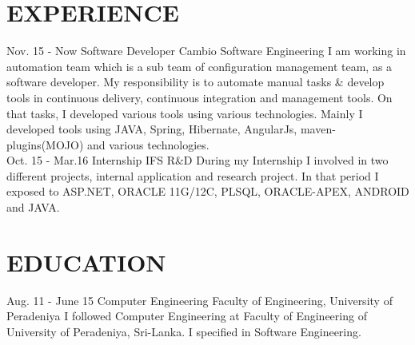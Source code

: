 \documentclass[]{cv-class}
\begin{document}
\section{EXPERIENCE}
\begin{entrylist}
  \entry
    {Nov. 15 - Now}
    {Software Developer}
    {Cambio Software Engineering}
    {I am working in automation team which is a sub team of configuration management team, as a software developer. My responsibility is to automate manual tasks \& develop tools in continuous delivery, continuous integration and management tools. On that tasks, I developed various tools using various technologies. Mainly I developed tools using JAVA, Spring, Hibernate, AngularJs, maven-plugins(MOJO) and various technologies.}
\\
  \entry
    {Oct. 15 - Mar.16}
    {Internship}
    {IFS R\&D}
    {During my Internship I involved in two different projects, internal application and research project. In that period I exposed to ASP.NET, ORACLE 11G/12C, PLSQL, ORACLE-APEX, ANDROID and JAVA.}
\end{entrylist}

\section{EDUCATION}
\begin{entrylist}
  \entry
    {Aug. 11 - June 15}
    {Computer Engineering}
    {Faculty of Engineering, University of Peradeniya}
    {I followed Computer Engineering at Faculty of Engineering of University of Peradeniya, Sri-Lanka. I specified in Software Engineering.}
\end{entrylist}
\end{document}
